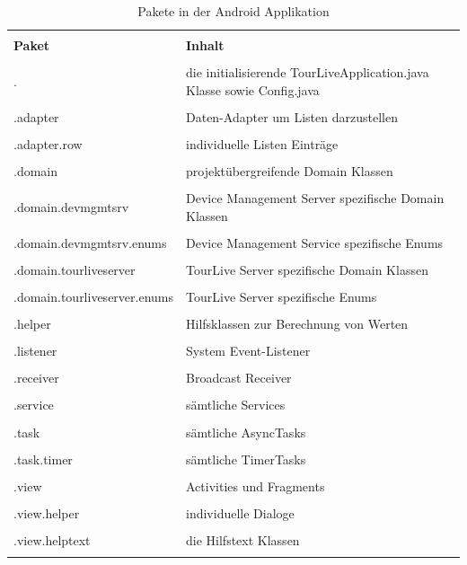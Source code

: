 \begin{longtable}{>{\RaggedRight}p{5.0cm} | >{\RaggedRight}p{7.1cm}}
 & \\ [-1.5ex]
\textbf{Paket} & \textbf{Inhalt}  \\ [1ex] \hline \hline &  \\ [-1.5ex]
. & die initialisierende TourLiveApplication.java Klasse sowie Config.java  \\ [1ex] \hline &  \\ [-1.5ex]
.adapter & Daten-Adapter um Listen darzustellen \\ [1ex] \hline &  \\ [-1.5ex]
.adapter.row & individuelle Listen Einträge \\ [1ex] \hline &  \\ [-1.5ex]
.domain & projektübergreifende Domain Klassen \\ [1ex] \hline &  \\ [-1.5ex]
.domain.devmgmtsrv & Device Management Server spezifische Domain Klassen \\ [1ex] \hline &  \\ [-1.5ex]
.domain.devmgmtsrv.enums & Device Management Service spezifische Enums \\ [1ex] \hline &  \\ [-1.5ex]
.domain.tourliveserver & TourLive Server spezifische Domain Klassen\\ [1ex] \hline &  \\ [-1.5ex]
.domain.tourliveserver.enums & TourLive Server spezifische Enums \\ [1ex] \hline &  \\ [-1.5ex]
.helper & Hilfsklassen zur Berechnung von Werten \\ [1ex] \hline &  \\ [-1.5ex]
.listener & System Event-Listener \\ [1ex] \hline &  \\ [-1.5ex]
.receiver & Broadcast Receiver \\ [1ex] \hline &  \\ [-1.5ex]
.service & sämtliche Services \\ [1ex] \hline &  \\ [-1.5ex]
.task & sämtliche AsyncTasks \\ [1ex] \hline &  \\ [-1.5ex]
.task.timer & sämtliche TimerTasks \\ [1ex] \hline &  \\ [-1.5ex]
.view & Activities und Fragments \\ [1ex] \hline &  \\ [-1.5ex]
.view.helper & individuelle Dialoge \\ [1ex] \hline &  \\ [-1.5ex]
.view.helptext & die Hilfstext Klassen \\ [1ex]
\caption{Pakete in der Android Applikation}
\end{longtable} 

